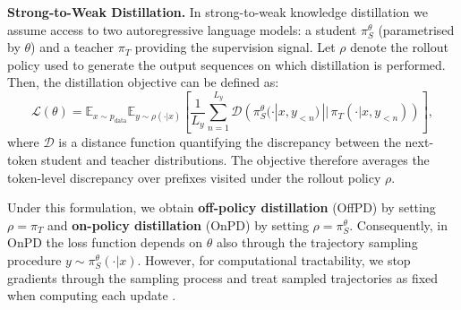 \documentclass{article} %
\theoremstyle{plain}
\theoremstyle{definition}
\theoremstyle{remark}
\begin{document}
\textbf{Strong-to-Weak Distillation.} In strong-to-weak knowledge distillation we assume access to two autoregressive language models: a student $\pi_S^\theta$ (parametrised by $\theta$) and a teacher $\pi_T$ providing the supervision signal. Let $\rho$ denote the rollout policy used to generate the output sequences on which distillation is performed. Then, the distillation objective can be defined as:
\begin{equation}
\label{eq:distillation_loss}
    \mathcal{L}(\theta) = \mathbb{E}_{x \sim p_{\mathrm{data}}}\mathbb{E}_{y \sim \rho( \cdot | x)}\left[\frac{1}{L_y}\sum_{n=1}^{L_y} \mathcal{D}\left(\pi_S^\theta(\cdot |x, y_{<n}) \, || \, \pi_T(\cdot |x,y_{<n}) \right) \right],
\end{equation}
where $\mathcal{D}$ is a distance function quantifying the discrepancy between the next-token student and teacher distributions. The objective therefore averages the token-level discrepancy over prefixes visited under the rollout policy $\rho$.

Under this formulation, we obtain \textbf{off-policy distillation} (OffPD) by setting $\rho = \pi_T$ and \textbf{on-policy distillation} (OnPD) by setting $\rho = \pi_S^{\theta}$. Consequently, in OnPD the loss function depends on $\theta$ also through the trajectory sampling procedure $y \sim \pi_S^\theta(\cdot | x)$. However, for computational tractability, we stop gradients through the sampling process and treat sampled trajectories as fixed when computing each update \citep{agarwal_-policy_2024, tang_few_2025}.
\end{document}
